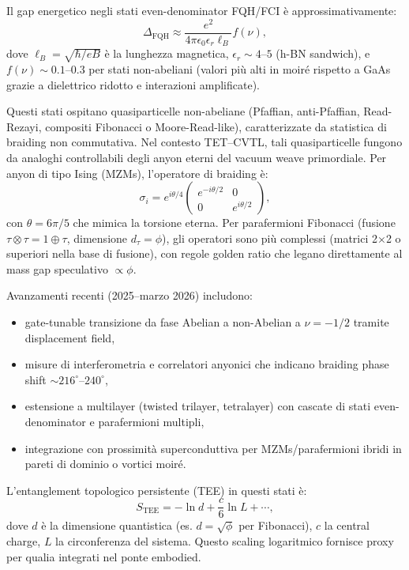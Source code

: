\documentclass[11pt,a4paper]{article}
\theoremstyle{plain}
\theoremstyle{definition}
\begin{document}
Il gap energetico negli stati even-denominator FQH/FCI è approssimativamente:
\begin{equation}
\Delta_{\text{FQH}} \approx \frac{e^2}{4\pi \epsilon_0 \epsilon_r \ell_B} f(\nu),
\end{equation}
dove $\ell_B = \sqrt{\hbar / eB}$ è la lunghezza magnetica, $\epsilon_r \sim 4$--$5$ (h-BN sandwich), e $f(\nu) \sim 0.1$--$0.3$ per stati non-abeliani (valori più alti in moiré rispetto a GaAs grazie a dielettrico ridotto e interazioni amplificate).

Questi stati ospitano quasiparticelle non-abeliane (Pfaffian, anti-Pfaffian, Read-Rezayi, compositi Fibonacci o Moore-Read-like), caratterizzate da statistica di braiding non commutativa. Nel contesto TET--CVTL, tali quasiparticelle fungono da analoghi controllabili degli anyon eterni del vacuum weave primordiale. Per anyon di tipo Ising (MZMs), l'operatore di braiding è:
\begin{equation}
\sigma_i = e^{i \theta / 4} \begin{pmatrix} e^{-i \theta / 2} & 0 \\ 0 & e^{i \theta / 2} \end{pmatrix},
\end{equation}
con $\theta = 6\pi/5$ che mimica la torsione eterna. Per parafermioni Fibonacci (fusione $\tau \otimes \tau = 1 \oplus \tau$, dimensione $d_\tau = \phi$), gli operatori sono più complessi (matrici 2×2 o superiori nella base di fusione), con regole golden ratio che legano direttamente al mass gap speculativo $\propto \phi$.

Avanzamenti recenti (2025--marzo 2026) includono:
\begin{itemize}
    \item gate-tunable transizione da fase Abelian a non-Abelian a $\nu = -1/2$ tramite displacement field,
    \item misure di interferometria e correlatori anyonici che indicano braiding phase shift $\sim 216^\circ$--$240^\circ$,
    \item estensione a multilayer (twisted trilayer, tetralayer) con cascate di stati even-denominator e parafermioni multipli,
    \item integrazione con prossimità superconduttiva per MZMs/parafermioni ibridi in pareti di dominio o vortici moiré.
\end{itemize}

L'entanglement topologico persistente (TEE) in questi stati è:
\begin{equation}
S_{\text{TEE}} = -\ln d + \frac{c}{6} \ln L + \cdots,
\end{equation}
dove $d$ è la dimensione quantistica (es. $d = \sqrt{\phi}$ per Fibonacci), $c$ la central charge, $L$ la circonferenza del sistema. Questo scaling logaritmico fornisce proxy per qualia integrati nel ponte embodied.
\end{document}
